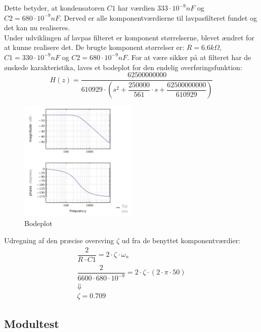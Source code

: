Dette betyder, at kondensatoren $ C1 $ har værdien $ 333\cdot 10^{-9} nF $  og  $ C2 = 680\cdot 10^{-9} nF$. Derved er alle komponentværdierne til lavpasfilteret fundet og det kan nu realiseres. \\ 
\newline
Under udviklingen af lavpas filteret er komponent størrelserne, blevet ændret for at kunne realisere det. De brugte komponent størrelser er: $ R= 6.6 k\Omega $, $ C1= 330\cdot 10 ^{-9} nF$ og $ C2= 680\cdot 10^{-9} nF$.   
For at være sikker på at filteret har de ønskede karakteristika, laves et bodeplot for den endelig overføringsfunktion: 
\begin{equation}
H(z)=\dfrac{62500000000}{610929\cdot \left( s^2+\dfrac{250000}{561}\cdot s + \dfrac{62500000000}{610929} \right)}
\end{equation}
\begin{figure}[H]
	\centering
	\includegraphics[width=0.5\textwidth]{Figurer/Bodeplot}
	\caption{Bodeplot}
	\label{fig:bodeplot}
\end{figure}
Udregning af den præcise oversving $ \zeta $ ud fra de benyttet komponentværdier: 
\begin{equation}
\begin{split}
\dfrac{2}{R\cdot C1}= 2\cdot \zeta\cdot \omega_n\\
\dfrac{2}{6600\cdot 680\cdot 10^{-9}}= 2\cdot \zeta\cdot (2\cdot \pi \cdot 50)\\
\Downarrow\\
\zeta = 0.709
\end{split}
\end{equation}

\subsection{Modultest}
